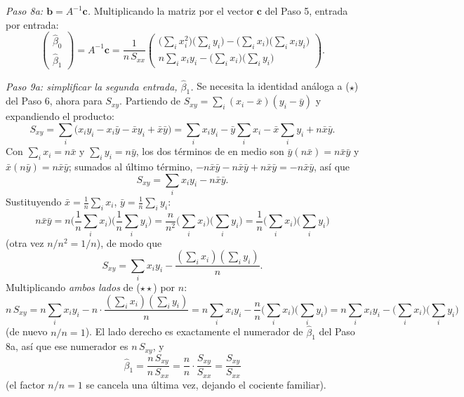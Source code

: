 \documentclass[11pt,a4paper,oneside]{article}
\theoremstyle{plain}
\theoremstyle{definition}
\begin{document}
\emph{Paso 8a: $\mathbf b=A^{-1}\mathbf c$.} Multiplicando la matriz por
el vector $\mathbf c$ del Paso 5, entrada por entrada:
\[
  \begin{pmatrix}\hat\beta_0\\\hat\beta_1\end{pmatrix}=A^{-1}\mathbf c
  =\frac1{n\,S_{xx}}
  \begin{pmatrix}\Big(\sum_ix_i^2\Big)\Big(\sum_iy_i\Big)-\Big(\sum_ix_i\Big)\Big(\sum_ix_iy_i\Big)\\[6pt]
  n\displaystyle\sum_ix_iy_i-\Big(\sum_ix_i\Big)\Big(\sum_iy_i\Big)\end{pmatrix}.
\]

\emph{Paso 9a: simplificar la segunda entrada, $\hat\beta_1$.} Se
necesita la identidad análoga a ($\star$) del Paso 6, ahora para
$S_{xy}$. Partiendo de $S_{xy}=\sum_i(x_i-\bar x)(y_i-\bar y)$ y
expandiendo el producto:
\[
  S_{xy} = \sum_i\big(x_iy_i-x_i\bar y-\bar xy_i+\bar x\bar y\big)
  = \sum_ix_iy_i - \bar y\sum_ix_i - \bar x\sum_iy_i + n\bar x\bar y .
\]
Con $\sum_ix_i=n\bar x$ y $\sum_iy_i=n\bar y$, los dos términos de en
medio son $\bar y(n\bar x)=n\bar x\bar y$ y $\bar x(n\bar y)=n\bar x\bar y$;
sumados al último término, $-n\bar x\bar y-n\bar x\bar y+n\bar x\bar y=-n\bar x\bar y$, así que
\[
  S_{xy} = \sum_ix_iy_i - n\bar x\bar y .
\]
Sustituyendo $\bar x=\frac1n\sum_ix_i$, $\bar y=\frac1n\sum_iy_i$:
\[
  n\bar x\bar y = n\Big(\frac1n\sum_ix_i\Big)\Big(\frac1n\sum_iy_i\Big)
  = \frac{n}{n^2}\Big(\sum_ix_i\Big)\Big(\sum_iy_i\Big)
  = \frac1n\Big(\sum_ix_i\Big)\Big(\sum_iy_i\Big)
\]
(otra vez $n/n^2=1/n$), de modo que
\[
  S_{xy} = \sum_ix_iy_i-\frac{(\sum_ix_i)(\sum_iy_i)}{n}. \tag{$\star\star$}
\]
Multiplicando \emph{ambos lados} de ($\star\star$) por $n$:
\[
  n\,S_{xy} = n\sum_ix_iy_i - n\cdot\frac{(\sum_ix_i)(\sum_iy_i)}{n}
  = n\sum_ix_iy_i-\frac{n}{n}\Big(\sum_ix_i\Big)\Big(\sum_iy_i\Big)
  = n\sum_ix_iy_i-\Big(\sum_ix_i\Big)\Big(\sum_iy_i\Big)
\]
(de nuevo $n/n=1$). El lado derecho es exactamente el numerador de
$\hat\beta_1$ del Paso 8a, así que ese numerador es $n\,S_{xy}$, y
\[
  \hat\beta_1=\frac{n\,S_{xy}}{n\,S_{xx}}
  = \frac{n}{n}\cdot\frac{S_{xy}}{S_{xx}}
  = \frac{S_{xy}}{S_{xx}}
\]
(el factor $n/n=1$ se cancela una última vez, dejando el cociente
familiar).
\end{document}
